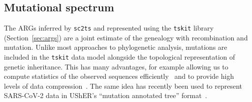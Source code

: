 \documentclass{article}
\begin{document}
\subsection{Mutational spectrum}
\label{sec:mutation_spectrum}
The ARGs inferred by \texttt{sc2ts} and represented using the \texttt{tskit}
library (Section~\ref{sec:args}) are a joint estimate of the genealogy with recombination and mutation. Unlike most approaches to
phylogenetic analysis, mutations are included in the \texttt{tskit}
data model alongside
the topological representation of genetic inheritance.
This has many
advantages, for example allowing us to compute statistics of the observed
sequences efficiently~\citep{Kelleher2016-wk,Ralph2020-efficiently} and
to provide high levels of data compression~\citep{Kelleher2019-ba}.
The same idea has recently been used to represent
SARS-CoV-2 data in UShER's ``mutation annotated tree''
format~\citep{Turakhia2021-ur}.
\end{document}
